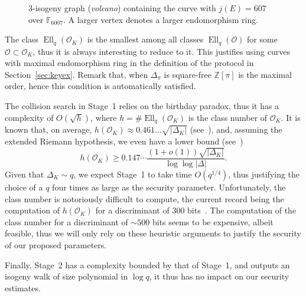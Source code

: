 \documentclass{article}
\newcommand{\F}{\mathbb{F}}
\renewcommand{\O}{\mathcal{O}}
\theoremstyle{definition}
\DeclareMathOperator{\Ell}{Ell}
\begin{document}
\begin{figure}
  \centering
  \caption{$3$-isogeny graph (\emph{volcano}) containing the curve
    with $j(E)=607$ over $\F_{6007}$. A larger vertex denotes a larger
    endomorphism ring.}
  \label{fig:volcano}
\end{figure}

The class $\Ell_q(\O_K)$ is the smallest among all classes
$\Ell_q(\O)$ for some $\O⊂\O_K$, thus it is always interesting to
reduce to it. This justifies using curves with maximal endomorphism
ring in the definition of the protocol in
Section~\ref{sec:keyex}. Remark that, when $Δ_π$ is square-free $ℤ[π]$
is the maximal order, hence this condition is automatically satisfied.

The collision search in Stage~1 relies on the birthday paradox, thus
it has a complexity of $O(\sqrt{h})$, where $h=\#\Ell_q(\O_K)$ is the
class number of $\O_K$.  It is known that, on average,
$h(\O_K)≈0.461\dots\sqrt{|Δ_K|}$ (see~\cite[5.10]{Cohen1993}), and,
assuming the extended Riemann hypothesis, we even have a lower bound
(see~\cite{littlewood1928class})
\[h(\O_K) ≥ 0.147\cdots\frac{(1+o(1))\sqrt{|Δ_K|}}{\log\log|Δ|}.\]
Given that $Δ_K\sim q$, we expect Stage~1 to take time $O(q^{1/4})$,
thus justifying the choice of a $q$ four times as large as the
security parameter.  Unfortunately, the class number is notoriously
difficult to compute, the current record being the computation of
$h(\O_K)$ for a discriminant of 300
bits~\cite{10.1007/978-3-642-14081-5_15}. The computation of the class
number for a discriminant of $\sim 500$ bits seems to be expensive,
albeit feasible, thus we will only rely on these heuristic arguments
to justify the security of our proposed parameters.

Finally, Stage~2 has a complexity bounded by that of Stage~1, and
outputs an isogeny walk of size polynomial in $\log q$, it thus has no
impact on our security estimates.
\end{document}
